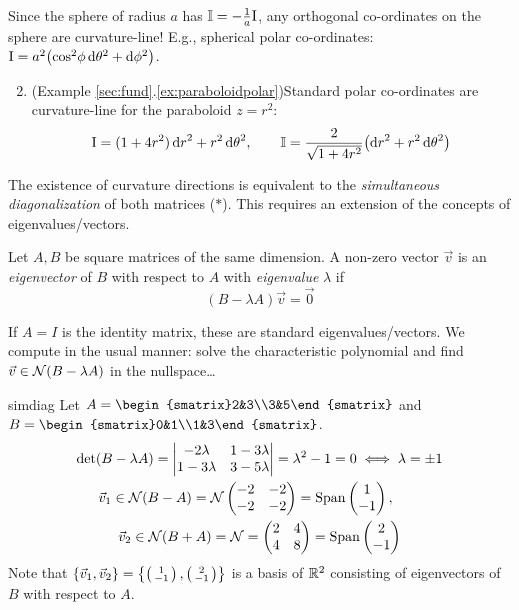 \begin{examples}{}{}
	\exstart Since the sphere of radius $a$ has $\mathbb{I}=-\frac 1a\mathrm{I}$, any orthogonal co-ordinates on the sphere are curvature-line! E.g., spherical polar co-ordinates: $\mathrm{I}=a^2\bigl(\cos^2\!\phi\,\mathrm{d}\theta^2+\mathrm{d}\phi^2\bigr)$.
	\begin{enumerate}\setcounter{enumi}{1}
	  \item (Example \ref*{sec:fund}.\ref{ex:paraboloidpolar})\lstsp Standard polar co-ordinates are curvature-line for the paraboloid $z=r^2$:
	  \[
	  	\mathrm{I}=(1+4r^2)\,{\mathrm{d} r}^2+r^2\,{\mathrm{d}\theta}^2, \qquad \mathbb{I}=\frac{2}{\sqrt{1+4r^2}}\big({\mathrm{d} r}^2+r^2\,{\mathrm{d}\theta}^2\bigr)
	  \]
	\end{enumerate}
\end{examples}




The existence of curvature directions is equivalent to the \emph{simultaneous diagonalization} of both matrices ($\ast$). This requires an extension of the concepts of eigenvalues/vectors.


\begin{defn}{}{}
	Let $A,B$ be square matrices of the same dimension. A non-zero vector $\vec v$ is an \emph{eigenvector} of $B$ with respect to $A$ with \emph{eigenvalue} $\lambda$ if
	\[
		(B-\lambda A)\vec v=\vec 0
	\]
\end{defn}

If $A=I$ is the identity matrix, these are standard eigenvalues/vectors. We compute in the usual manner: solve the characteristic polynomial and find $\vec v\in\mathcal{N}(B-\lambda A)$ in the nullspace\ldots

\goodbreak

\begin{example}{}{simdiag}
	Let $A=\begin{smatrix}2&3\\3&5\end{smatrix}$ and $B=\begin{smatrix}0&1\\1&3\end{smatrix}$.
	\begin{gather*}
		\det(B-\lambda A)=
		\begin{vmatrix}
			-2\lambda&1-3\lambda\\
			1-3\lambda&3-5\lambda
		\end{vmatrix}
		=\lambda^2-1=0\iff \lambda=\pm 1\\
		\vec v_1\in\mathcal{N}(B-A)=\mathcal{N}
		\begin{pmatrix}
			-2&-2\\-2&-2
		\end{pmatrix}
		=\operatorname{Span}\begin{pmatrix}1\\-1\end{pmatrix},\qquad\\
		\vec v_2\in\mathcal{N}(B+A)=\mathcal{N}=
		\begin{pmatrix}
			2&4\\4&8
		\end{pmatrix}
		=\operatorname{Span}\begin{pmatrix}2\\-1\end{pmatrix}
	\end{gather*}
	Note that $\{\vec v_1,\vec v_2\}=\left\{\left(\begin{smallmatrix}1\\-1\end{smallmatrix}\right),\left(\begin{smallmatrix}2\\-1\end{smallmatrix}\right)\right\}$ is a basis of $\mathbb{R}^2$ consisting of eigenvectors of $B$ with respect to $A$.
\end{example}


